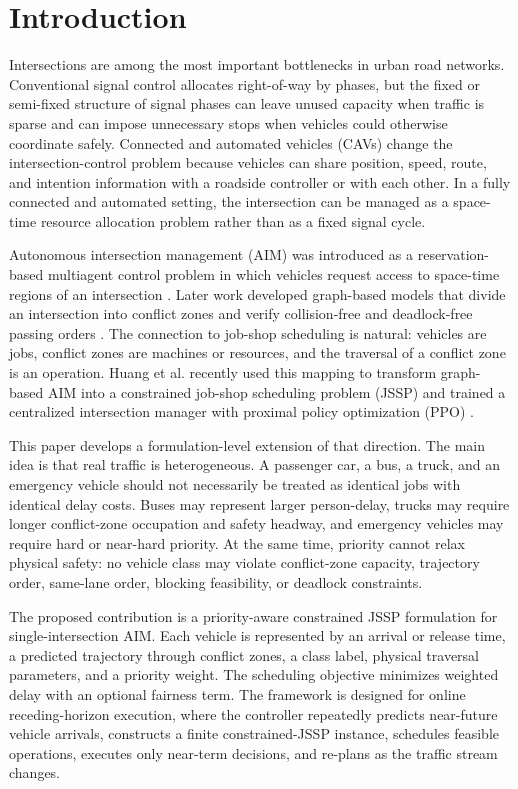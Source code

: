 \section{Introduction}

Intersections are among the most important bottlenecks in urban road networks. Conventional signal control allocates right-of-way by phases, but the fixed or semi-fixed structure of signal phases can leave unused capacity when traffic is sparse and can impose unnecessary stops when vehicles could otherwise coordinate safely. Connected and automated vehicles (CAVs) change the intersection-control problem because vehicles can share position, speed, route, and intention information with a roadside controller or with each other. In a fully connected and automated setting, the intersection can be managed as a space-time resource allocation problem rather than as a fixed signal cycle.

Autonomous intersection management (AIM) was introduced as a reservation-based multiagent control problem in which vehicles request access to space-time regions of an intersection \cite{dresner2008multiagent}. Later work developed graph-based models that divide an intersection into conflict zones and verify collision-free and deadlock-free passing orders \cite{lin2019graph}. The connection to job-shop scheduling is natural: vehicles are jobs, conflict zones are machines or resources, and the traversal of a conflict zone is an operation. Huang et al. recently used this mapping to transform graph-based AIM into a constrained job-shop scheduling problem (JSSP) and trained a centralized intersection manager with proximal policy optimization (PPO) \cite{huang2023reinforcement}.

This paper develops a formulation-level extension of that direction. The main idea is that real traffic is heterogeneous. A passenger car, a bus, a truck, and an emergency vehicle should not necessarily be treated as identical jobs with identical delay costs. Buses may represent larger person-delay, trucks may require longer conflict-zone occupation and safety headway, and emergency vehicles may require hard or near-hard priority. At the same time, priority cannot relax physical safety: no vehicle class may violate conflict-zone capacity, trajectory order, same-lane order, blocking feasibility, or deadlock constraints.

The proposed contribution is a priority-aware constrained JSSP formulation for single-intersection AIM. Each vehicle is represented by an arrival or release time, a predicted trajectory through conflict zones, a class label, physical traversal parameters, and a priority weight. The scheduling objective minimizes weighted delay with an optional fairness term. The framework is designed for online receding-horizon execution, where the controller repeatedly predicts near-future vehicle arrivals, constructs a finite constrained-JSSP instance, schedules feasible operations, executes only near-term decisions, and re-plans as the traffic stream changes.

